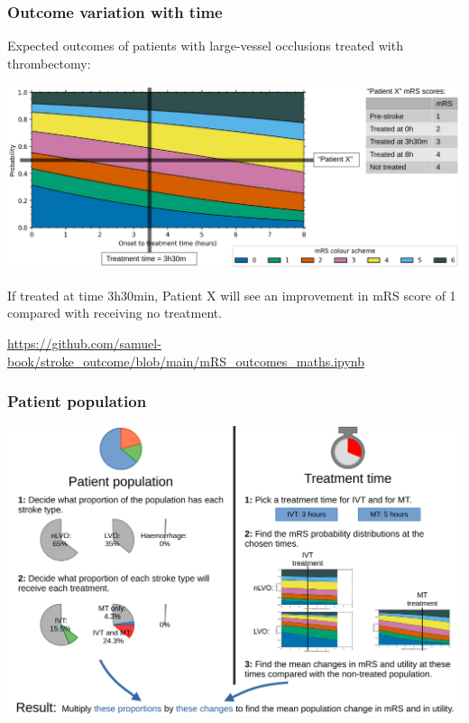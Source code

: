 \documentclass[xcolor={usenames,dvipsnames}]{beamer}
\newcommand{\smallurl}[1]{\textcolor{blue}{\fontsize{4pt}{4.8pt}\selectfont \url{#1}}}
\begin{document}
\begin{frame}
\frametitle{Outcome variation with time}

Expected outcomes of patients with large-vessel occlusions treated with thrombectomy: 

\begin{center} 
\includegraphics[width=\textwidth]{./images/probs_with_time_annotated}
\end{center} 


If treated at time 3h30min, Patient X will see an improvement in mRS score of 1 compared with receiving no treatment. 

\vspace{1em}
\smallurl{https://github.com/samuel-book/stroke_outcome/blob/main/mRS_outcomes_maths.ipynb}


\end{frame}



\begin{frame}
\frametitle{Patient population}

\begin{center} 
\includegraphics[width=\textwidth]{./images/population_method}
\end{center} 

\end{frame}
\end{document}
